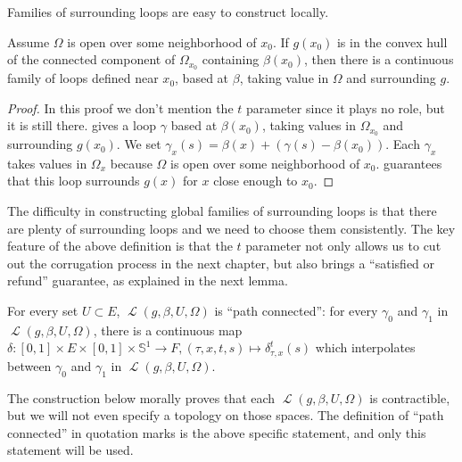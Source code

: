 \documentclass[10pt,a4paper]{article}
\newcounter{chapter}
\newcommand{\co}{\!:}
\DeclareMathOperator{\Loop}{\mathcal{L}}
\newcommand{\uses}[1]{}
\newcommand{\lean}[1]{}
\newcommand{\leanok}{}
\begin{document}
Families of surrounding loops are easy to construct locally.

\begin{lemma}
  \label{lem:local_loops}
  \uses{def:family_surrounds}
  \lean{local_loops}
  \leanok
  Assume $Ω$ is open over some neighborhood of $x_0$.
  If $g(x_0)$ is in the convex hull of the connected component of $Ω_{x_0}$ containing $β(x_0)$,
  then there is a continuous family of loops defined near $x_0$, based at $β$,
  taking value in $Ω$ and surrounding $g$.
\end{lemma}

\begin{proof}
  \leanok
  \uses{lem:loop_of_hull, lem:smooth_barycentric_coord}
  In this proof we don't mention the $t$ parameter since it plays no
  role, but it is still there.
   gives a loop $γ$ based at $β(x_0)$,
  taking values in $Ω_{x_0}$ and surrounding $g(x_0)$.
  We set $γ_x(s) = β(x) + (γ(s) - β(x_0))$.
  Each $γ_x$ takes values in $Ω_x$ because $Ω$ is open over some
  neighborhood of $x_0$.
   guarantees that this loop surrounds $g(x)$
  for $x$ close enough to $x_0$.
\end{proof}

The difficulty in constructing global families of surrounding loops is that
there are plenty of surrounding loops and we need to choose them
consistently.
The key feature of the above definition is that the $t$ parameter not only
allows us to cut out the corrugation
process in the next chapter, but also brings a ``satisfied or refund'' guarantee,
as explained in the next lemma.

\begin{lemma}
  \label{lem:satisfied_or_refund}
  \uses{def:family_surrounds}
  \lean{satisfied_or_refund}
  \leanok
  For every set $U ⊂ E$,  $\Loop(g, β, U, Ω)$ is ``path connected'':
  for every $γ_0$ and $γ_1$ in $\Loop(g, β, U, Ω)$,
  there is a continuous map
  $δ \co [0, 1] × E × [0, 1] × 𝕊^1 → F, (τ, x, t, s) ↦ δ^t_{τ, x}(s)$
  which interpolates between $γ_0$ and $γ_1$ in
  $\Loop(g, β, U, Ω)$.
\end{lemma}

The construction below morally proves that each $\Loop(g, β, U, Ω)$ is contractible, but
we will not even specify a topology on those spaces.
The definition of ``path connected'' in quotation marks is the above specific statement,
and only this statement will be used.
\end{document}
